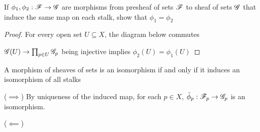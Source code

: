 \begin{proposition}
	If $\phi_1, \phi_2: \mathscr{F} \to \mathscr{G}$ are morphisms from presheaf of sets $\mathscr{F}$ to sheaf of sets $\mathscr{G}$ that induce the same map on each stalk, show that $\phi_1 = \phi_2$
\end{proposition}

\begin{proof}
	For every open set $U \subseteq X$, the diagram below commutes
	
	\begin{center}
	\end{center}
	
	$\mathscr{G}(U) \to \prod_{p \in U}\mathscr{G}_p$ being injective implies $\phi_2(U) = \phi_1(U)$
\end{proof}

\begin{proposition}
	A morphism of sheaves of sets is an isomorphism if and only if it induces an isomorphism of all stalks
\end{proposition}

\begin{longproof}
	($\implies$) By uniqueness of the induced map, for each $p \in X$, $\bar{\phi}_p: \mathscr{F}_p \to \mathscr{G}_p$ is an isomorphism.
	
	\begin{center}
	\end{center}
	
	($\impliedby$)
	
\end{longproof}